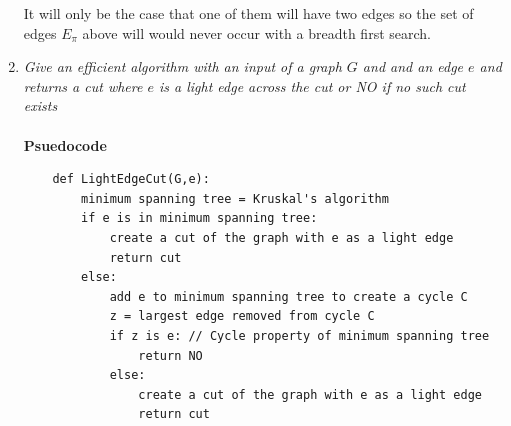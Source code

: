 \documentclass[12pt]{article}
\begin{document}
\begin{enumerate}
	It will only be the case that one of them will have two edges so the set of edges $E_\pi$ above will would never occur with a breadth first search.
	\newpage
	\item \textit{Give an efficient algorithm with an input of a graph $G$ and and an edge $e$ and returns a cut where $e$ is a light edge across the cut or NO if no such cut exists}\\
	\\
	\textbf{Psuedocode}
	\begin{verbatim}
	def LightEdgeCut(G,e):
	    minimum spanning tree = Kruskal's algorithm
	    if e is in minimum spanning tree:
	        create a cut of the graph with e as a light edge
	        return cut
	    else:
	        add e to minimum spanning tree to create a cycle C
	        z = largest edge removed from cycle C
	        if z is e: // Cycle property of minimum spanning tree
	            return NO
	        else:
	            create a cut of the graph with e as a light edge
	            return cut
	\end{verbatim}
	

\end{enumerate}
\end{document}
